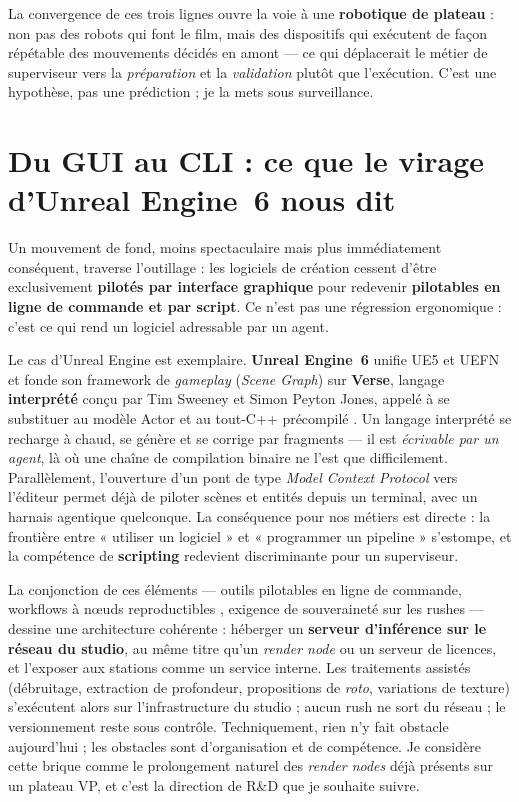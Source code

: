 \documentclass[11pt,a4paper]{report}
\begin{document}
La convergence de ces trois lignes ouvre la voie à une \textbf{robotique de plateau} : non pas
des robots qui font le film, mais des dispositifs qui exécutent de façon répétable des mouvements
décidés en amont --- ce qui déplacerait le métier de superviseur vers la \emph{préparation} et la
\emph{validation} plutôt que l'exécution. C'est une hypothèse, pas une prédiction ; je la mets sous
surveillance.

\section{Du GUI au CLI : ce que le virage d'Unreal Engine~6 nous dit}
Un mouvement de fond, moins spectaculaire mais plus immédiatement conséquent, traverse
l'outillage : les logiciels de création cessent d'être exclusivement \textbf{pilotés par interface
graphique} pour redevenir \textbf{pilotables en ligne de commande et par script}. Ce n'est pas
une régression ergonomique : c'est ce qui rend un logiciel adressable par un agent.

Le cas d'Unreal Engine est exemplaire. \textbf{Unreal Engine~6} unifie UE5 et UEFN et fonde son
framework de \emph{gameplay} (\emph{Scene Graph}) sur \textbf{Verse}, langage
\textbf{interprété} conçu par Tim Sweeney et Simon Peyton Jones, appelé à se substituer au
modèle Actor et au tout-C++ précompilé \autocite{epic_ue6verse2026}. Un langage interprété se
recharge à chaud, se génère et se corrige par fragments --- il est \emph{écrivable par un agent},
là où une chaîne de compilation binaire ne l'est que difficilement. Parallèlement, l'ouverture
d'un pont de type \emph{Model Context Protocol} vers l'éditeur permet déjà de piloter scènes et
entités depuis un terminal, avec un harnais agentique quelconque. La conséquence pour nos
métiers est directe : la frontière entre « utiliser un logiciel » et « programmer un pipeline »
s'estompe, et la compétence de \textbf{scripting} redevient discriminante pour un superviseur.

\begin{infobox}[title={Piste : un serveur d'inférence local dans le pipeline VFX}]
La conjonction de ces éléments --- outils pilotables en ligne de commande, workflows à n\oe uds
reproductibles \autocite{ktt_supervfx2026}, exigence de souveraineté sur les rushes --- dessine une
architecture cohérente : héberger un \textbf{serveur d'inférence sur le réseau du studio}, au
même titre qu'un \emph{render node} ou un serveur de licences, et l'exposer aux stations comme
un service interne. Les traitements assistés (débruitage, extraction de profondeur, propositions
de \emph{roto}, variations de texture) s'exécutent alors sur l'infrastructure du studio ; aucun
rush ne sort du réseau ; le versionnement reste sous contrôle. Techniquement, rien n'y fait
obstacle aujourd'hui ; les obstacles sont d'organisation et de compétence. Je considère cette
brique comme le prolongement naturel des \emph{render nodes} déjà présents sur un plateau VP,
et c'est la direction de R\&D que je souhaite suivre.
\end{infobox}
\end{document}

